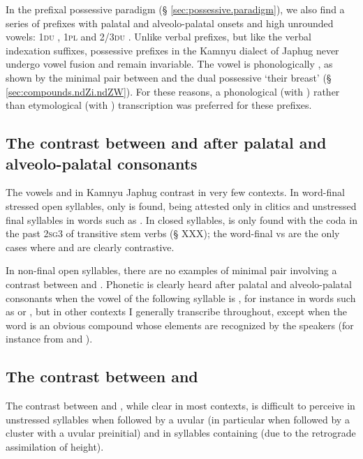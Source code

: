 In the prefixal possessive paradigm (§ \ref{sec:possessive.paradigm}), we also find a series of prefixes with palatal and alveolo-palatal onsets and high unrounded vowels: \textsc{1du} , \textsc{1pl}  and \textsc{2/3du} . Unlike verbal prefixes, but like the verbal indexation suffixes, possessive prefixes in the Kamnyu dialect of Japhug never undergo vowel fusion and remain invariable. The vowel is phonologically , as shown by the minimal pair between  and the dual possessive  `their breast' (§ \ref{sec:compounds.ndZi.ndZW}). For these reasons, a phonological (with ) rather than etymological (with ) transcription was preferred for these prefixes.

\subsection{The contrast between  and  after palatal and alveolo-palatal consonants}
The vowels  and  in Kamnyu Japhug contrast in very few contexts. In word-final stressed open syllables, only  is found,  being attested only in clitics and unstressed final syllables in words such as . In closed syllables,  is only found with the coda  in the past \textsc{2sg}\fl{}3 of transitive  stem verbs (§ XXX); the word-final  vs  are the only cases where  and  are clearly contrastive.

In non-final open syllables, there are no examples of minimal pair involving a contrast between  and . Phonetic  is clearly heard after palatal and alveolo-palatal consonants when the vowel of the following syllable is , for instance in words such as  or , but in other contexts I generally transcribe  throughout, except when the word is an obvious compound whose elements are recognized by the speakers (for instance  from  and ). 

\subsection{The contrast between  and } \label{sec:A.vs.a.prefixes}
The contrast between  and , while clear in most contexts, is difficult to perceive in unstressed syllables when followed by a uvular (in particular when followed by a cluster with a uvular preinitial) and in syllables containing  (due to the retrograde assimilation of height).

